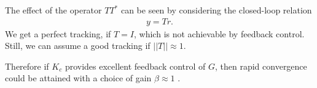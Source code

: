 The effect of the operator $T T^*$ can be seen by considering the closed-loop relation 
\begin{align}
y = Tr.
\end{align}
We get a perfect tracking, if $T = I$, which is not achievable by feedback control. Still, we can assume a good tracking if $||T|| \approx 1$. 

Therefore if $K_c$ provides excellent feedback control of $G$, then rapid convergence could be attained with a choice of gain $\beta \approx 1$ \cite{ILC}. %







